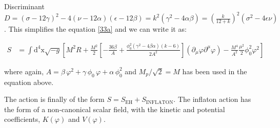 \documentclass[aps,prd,reprint,preprintnumbers,showpacs,floatfix,nofootinbib,superscript address]{revtex4-2}
\begin{document}
Discriminant $D = (\sigma -12 \gamma )^2-4 (\nu -12 \alpha ) (\epsilon -12 \beta ) = k^2 (\gamma^2 - 4\alpha \beta) = (\frac{k}{12+k})^2 (\sigma^2 -4 \epsilon \nu)$. This simplifies the equation \ref{33a} and we can write it as:
\begin{widetext}
    \begin{equation} 
    \begin{aligned}
        S &= \int \text{d}^4\text{x} \sqrt{-g} [ M^2 R + \frac{M^2}{2} \left[-\frac{36 \beta}{A} + \frac{\phi_0^2 (\gamma^2 - 4\beta\alpha)(k-6)}{2 A^2}\right] (\partial_\mu \varphi \partial^\mu \varphi) -  \frac{M^4}{A^2} \frac{\mu^2}{2} \phi^2_0 \varphi^2 ] 
    \end{aligned}
\end{equation}
\end{widetext}
where again, $A =\beta\,\varphi^2 + \gamma\,\phi_0\,\varphi + \alpha\,\phi_0^2$ and $M_p/\sqrt{2} = M$ has been used in the equation above.

The action is finally of the form $S = S_{\text{EH}} + S_{\text{INFLATON}}$. The inflaton action has the form of a non-canonical scalar field, with the kinetic and potential coefficients, $K(\varphi)$ and $V(\varphi)$.
\end{document}
